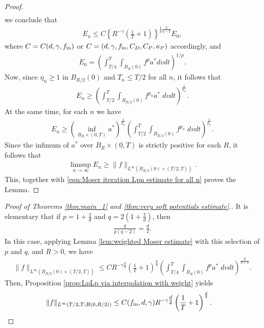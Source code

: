 \documentclass[12pt,american]{amsart}
\numberwithin{equation}{section}
\theoremstyle{plain}
\theoremstyle{definition}                  %
\def\astar{{a^*}}
\def\fin{f_{\textnormal{in}}}
\begin{document}
\begin{proof}
\begin{align*}
  \end{align*}
  we conclude that
  \begin{align}\label{eqn:Moser iteration Lpn estimate for all n}
    E_n \leq C\left \{ R^{-\gamma}\left (\frac{1}{T}+1 \right ) \right \}^{\frac{1}{p}\frac{q}{q-2}}E_0,
  \end{align}
  where $C=C(d,\gamma,\fin)$ or $C=(d,\gamma,\fin,C_D,C_P,\kappa_P)$ accordingly, and
  \begin{align*}
    E_0 = \left( \int_{T/4}^T \int_{B_R(0)} f^p \astar  dvdt \right)^{1/p}.
  \end{align*}	
  Now, since $\eta_n\geq 1$ in $B_{R/2}(0)$ and $T_n\leq T/2$ for all $n$, it follows that
  \begin{align*}
    E_n \geq \left ( \int_{T/2}^T\int_{B_{R/2}(0)}   f^{p_n} \astar \;dvdt \right )^{\frac{1}{p_n}}.
  \end{align*}  
  At the same time, for each $n$ we have
  \begin{align*}
    E_n \geq \left ( \inf \limits_{B_R\times (0,T)} \astar \right )^{\frac{1}{p_n}} \left ( \int_{T/2}^T\int_{B_{R/2}(0)}  f^{p_n}\;dvdt \right )^{\frac{1}{p_n}}.
  \end{align*}  
  Since the infimum of $\astar$ over $B_R\times (0,T)$ is strictly positive for each $R$, it follows that
  \begin{align*}
    \limsup \limits_{n \to \infty} E_n \geq \| f\|_{L^\infty(B_{R/2}(0)\times (T/2,T))}.
  \end{align*}
  This, together with \eqref{eqn:Moser iteration Lpn estimate for all n} proves the Lemma.
  \end{proof}
   
\begin{proof}[Proof of Theorems \ref{thm:main_1} and \ref{thm:very soft potentials estimate}.]  
  It is elementary that if $p=1+\frac{2}{d}$ and $q=2(1+\frac{2}{d})$, then
  \begin{align*}
    \frac{q}{p(q-2)} = \frac{d}{2}.
  \end{align*}
  In this case, applying Lemma \ref{lem:weighted Moser estimate} with this selection of $p$ and $q$, and $R>0$, we have 
\begin{align*}
   \|f\|_{L^\infty(B_{R/2}(0)\times (T/2,T))} \leq C R^{-\gamma \tfrac{d}{2}}\left (\frac{1}{T}+1 \right )^{\frac{d}{2}} \left (\int_{T/4}^T \int_{B_R(0)}f^{p}\astar \;dvdt \right )^{\frac{d}{d+2}}.
\end{align*}
  Then, Proposition \ref{prop:LpLp via interpolation with weight} yields 
\begin{align*}
   \|f\|_{L^\infty({T}/{2},T; B(0, R/2))} &   \leq C(\fin,d,\gamma) R^{-\gamma \tfrac{d}{2}} \left (\frac{1}{T}+1 \right )^{\frac{d}{2}}.
\end{align*}

\end{proof}
   
\end{document}
